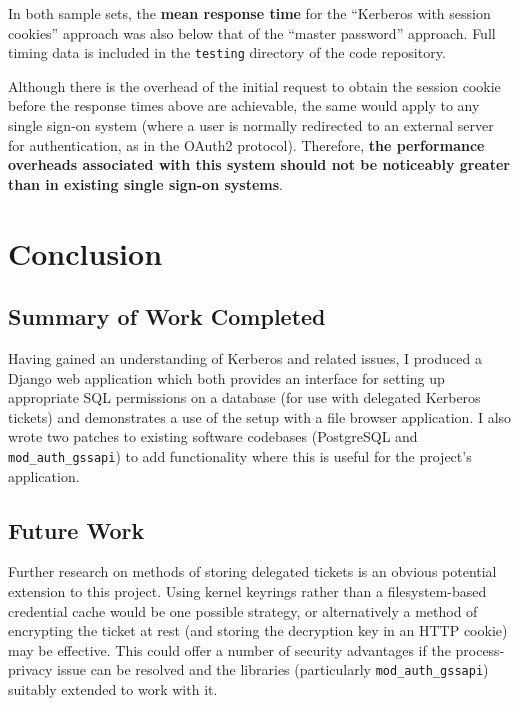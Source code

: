 \documentclass[12pt]{report}
\begin{document}
In both sample sets, the \textbf{mean response time} for the ``Kerberos with session cookies'' approach was also below that of the ``master password'' approach. Full timing data is included in the \texttt{testing} directory of the code repository.

Although there is the overhead of the initial request to obtain the session cookie before the response times above are achievable, the same would apply to any single sign-on system (where a user is normally redirected to an external server for authentication, as in the OAuth2 protocol). Therefore, \textbf{the performance overheads associated with this system should not be noticeably greater than in existing single sign-on systems}.


\chapter{Conclusion}
\section{Summary of Work Completed}
Having gained an understanding of Kerberos and related issues, I produced a Django web application which both provides an interface for setting up appropriate SQL permissions on a database (for use with delegated Kerberos tickets) and demonstrates a use of the setup with a file browser application. I also wrote two patches to existing software codebases (PostgreSQL and \verb+mod_auth_gssapi+) to add functionality where this is useful for the project's application.

\section{Future Work}
\label{sec:future_work}
Further research on methods of storing delegated tickets is an obvious potential extension to this project. Using kernel keyrings rather than a filesystem-based credential cache would be one possible strategy, or alternatively a method of encrypting the ticket at rest (and storing the decryption key in an HTTP cookie) may be effective. This could offer a number of security advantages if the process-privacy issue can be resolved and the libraries (particularly \verb+mod_auth_gssapi+) suitably extended to work with it.
\end{document}
